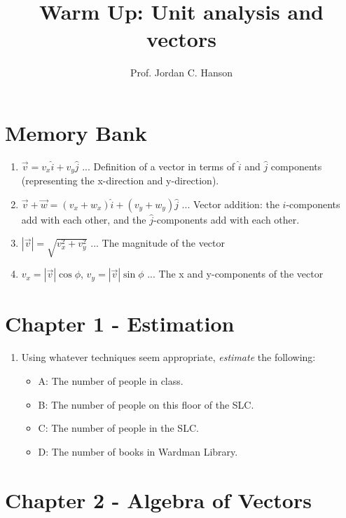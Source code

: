\documentclass{article}
\begin{document}
\title{Warm Up: Unit analysis and vectors}
\author{Prof. Jordan C. Hanson}

\maketitle

\section{Memory Bank}

\begin{enumerate}
\item $\vec{v} = v_x \hat{i} + v_y \hat{j}$ ... Definition of a vector in terms of $\hat{i}$ and $\hat{j}$ components (representing the x-direction and y-direction).
\item $\vec{v} + \vec{w} = (v_x + w_x) \hat{i} + (v_y + w_y) \hat{j}$ ... Vector addition: the $\hat{i}$-components add with each other, and the $\hat{j}$-components add with each other.\
\item $|\vec{v}| = \sqrt{v_x^2 + v_y^2}$ ... The magnitude of the vector
\item $v_x = |\vec{v}| \cos\phi$, $v_y = |\vec{v}| \sin\phi$ ... The x and y-components of the vector
\end{enumerate}

\section{Chapter 1 - Estimation}

\begin{enumerate}
\item Using whatever techniques seem appropriate, \textit{estimate} the following:
\begin{itemize}
\item A: The number of people in class.
\item B: The number of people on this floor of the SLC.
\item C: The number of people in the SLC.
\item D: The number of books in Wardman Library.
\end{itemize}
\end{enumerate}

\section{Chapter 2 - Algebra of Vectors}
\end{document}
